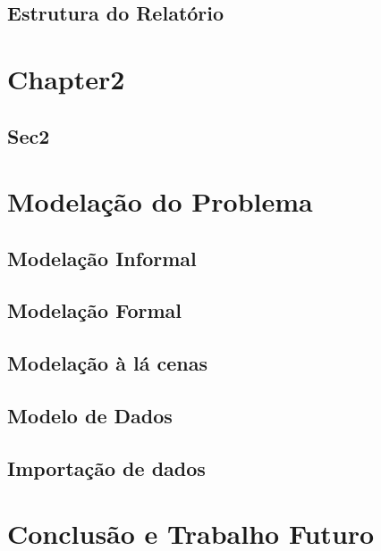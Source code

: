 \documentclass[english,a4paper]{report}
\begin{document}
\section{Estrutura do Relatório}

\newpage
\chapter{Chapter2} \label{chap xxx}

\section{Sec2}
\label{sec yyy}
\newpage
\chapter{Modelação do Problema} \label{chap modprob}

\section{Modelação Informal}
\label{sec modinf}
\section{Modelação Formal}
\label{sec modfor}
\section{Modelação à lá cenas}
\label{sec modcenas}
\section{Modelo de Dados}
\label{sec modedados}
\section{Importação de dados}
\label{sec xml}
\newpage
\chapter{Conclusão e Trabalho Futuro}\label{chap con} 

\newpage

%

\end{document}
